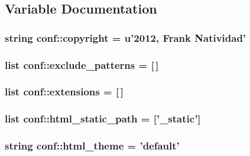 \subsection{\-Variable \-Documentation}
\hypertarget{namespaceconf_ac8ccf456b321bc9052c0691a173b6925}{
\subsubsection[{copyright}]{\setlength{\rightskip}{0pt plus 5cm}string {\bf conf\-::copyright} = u'2012, \-Frank \-Natividad'}}\label{namespaceconf_ac8ccf456b321bc9052c0691a173b6925}
\hypertarget{namespaceconf_aa01918cfe75aed3ae059dd96c71c8f08}{
\subsubsection[{exclude\-\_\-patterns}]{\setlength{\rightskip}{0pt plus 5cm}list {\bf conf\-::exclude\-\_\-patterns} = \mbox{[}$\,$\mbox{]}}}\label{namespaceconf_aa01918cfe75aed3ae059dd96c71c8f08}
\hypertarget{namespaceconf_a540efa67c53e84c1c353c1df2e37e39c}{
\subsubsection[{extensions}]{\setlength{\rightskip}{0pt plus 5cm}list {\bf conf\-::extensions} = \mbox{[}$\,$\mbox{]}}}\label{namespaceconf_a540efa67c53e84c1c353c1df2e37e39c}
\hypertarget{namespaceconf_acb91fefcfd3aa6f3529fa682ab834832}{
\subsubsection[{html\-\_\-static\-\_\-path}]{\setlength{\rightskip}{0pt plus 5cm}list {\bf conf\-::html\-\_\-static\-\_\-path} = \mbox{[}'\-\_\-static'\mbox{]}}}\label{namespaceconf_acb91fefcfd3aa6f3529fa682ab834832}
\hypertarget{namespaceconf_a7f1b143ff25817758abd21a7db110510}{
\subsubsection[{html\-\_\-theme}]{\setlength{\rightskip}{0pt plus 5cm}string {\bf conf\-::html\-\_\-theme} = 'default'}}\label{namespaceconf_a7f1b143ff25817758abd21a7db110510}
